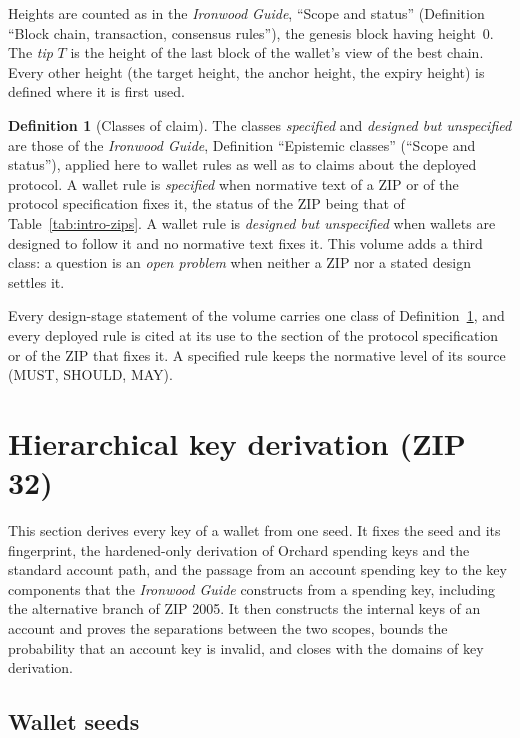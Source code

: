 \documentclass[11pt,a4paper]{article}
\theoremstyle{definition}
\newtheorem{definition}[theorem]{Definition}
\begin{document}
Heights are counted as in the \emph{Ironwood Guide}, ``Scope and status''
(Definition ``Block chain, transaction, consensus rules''), the genesis block
having height~$0$. The \emph{tip} $T$ is the height of the last block of the
wallet's view of the best chain. Every other height (the target height, the
anchor height, the expiry height) is defined where it is first used.

\begin{definition}[Classes of claim]\label{def:intro-classes}
The classes \emph{specified} and \emph{designed but unspecified} are those
of the \emph{Ironwood Guide}, Definition ``Epistemic classes'' (``Scope and
status''), applied here to wallet rules as well as to claims about the
deployed protocol. A wallet rule is \emph{specified} when normative text of
a ZIP or of the protocol specification fixes it, the status of the ZIP being
that of Table~\ref{tab:intro-zips}. A wallet rule is \emph{designed but
unspecified} when wallets are designed to follow it and no normative text
fixes it. This volume adds a third class: a question is an \emph{open
problem} when neither a ZIP nor a stated design settles it.
\end{definition}

Every design-stage statement of the volume carries one class of
Definition~\ref{def:intro-classes}, and every deployed rule is cited at its
use to the section of the protocol specification or of the ZIP that fixes
it. A specified rule keeps the normative level of its source (MUST, SHOULD,
MAY).

\section{Hierarchical key derivation (ZIP 32)}\label{sec:keys-zip32}

This section derives every key of a wallet from one seed. It fixes the seed
and its fingerprint, the hardened-only derivation of Orchard spending keys
and the standard account path, and the passage from an account spending key
to the key components that the \emph{Ironwood Guide} constructs from a
spending key, including the alternative branch of ZIP 2005. It then
constructs the internal keys of an account and proves the separations
between the two scopes, bounds the probability that an account key is
invalid, and closes with the domains of key derivation.

\subsection{Wallet seeds}\label{sec:zip32-seeds}
\end{document}
